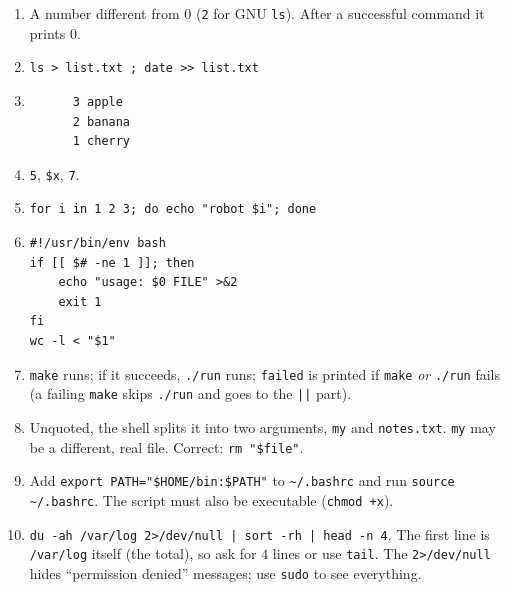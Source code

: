 \begin{enumerate}[label=\textbf{\ansnum.\arabic*}]
  \item A number different from $0$ (\texttt{2} for GNU \texttt{ls}). After a successful command it prints $0$.
  \item \verb|ls > list.txt ; date >> list.txt|
  \item \begin{verbatim}
      3 apple
      2 banana
      1 cherry
\end{verbatim}
  \item \texttt{5}, \texttt{\$x}, \texttt{7}.
  \item \verb|for i in 1 2 3; do echo "robot $i"; done|
  \item \begin{verbatim}
#!/usr/bin/env bash
if [[ $# -ne 1 ]]; then
    echo "usage: $0 FILE" >&2
    exit 1
fi
wc -l < "$1"
\end{verbatim}
  \item \texttt{make} runs; if it succeeds, \texttt{./run} runs; \texttt{failed} is printed if \texttt{make} \emph{or} \texttt{./run} fails (a failing \texttt{make} skips \texttt{./run} and goes to the \texttt{||} part).
  \item Unquoted, the shell splits it into two arguments, \texttt{my} and \texttt{notes.txt}. \texttt{my} may be a different, real file. Correct: \verb|rm "$file"|.
  \item Add \verb|export PATH="$HOME/bin:$PATH"| to \texttt{\textasciitilde/.bashrc} and run \verb|source ~/.bashrc|. The script must also be executable (\verb|chmod +x|).
  \item[\textbf{\ansnum.10}] \verb!du -ah /var/log 2>/dev/null | sort -rh | head -n 4!. The first line is \texttt{/var/log} itself (the total), so ask for $4$ lines or use \texttt{tail}. The \texttt{2>/dev/null} hides ``permission denied'' messages; use \texttt{sudo} to see everything.
\end{enumerate}
